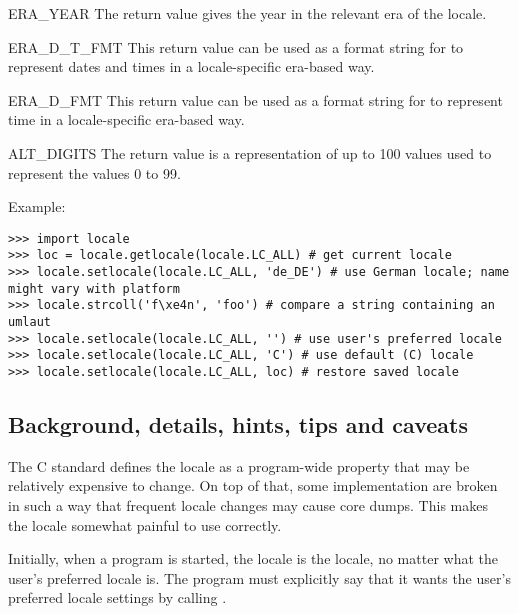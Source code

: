 \begin{datadesc}{ERA_YEAR}
The return value gives the year in the relevant era of the locale.
\end{datadesc}

\begin{datadesc}{ERA_D_T_FMT}
This return value can be used as a format string for
 to represent dates and times in a locale-specific
era-based way.
\end{datadesc}

\begin{datadesc}{ERA_D_FMT}
This return value can be used as a format string for
 to represent time in a locale-specific era-based
way.
\end{datadesc}

\begin{datadesc}{ALT_DIGITS}
The return value is a representation of up to 100 values used to
represent the values 0 to 99.
\end{datadesc}

Example:

\begin{verbatim}
>>> import locale
>>> loc = locale.getlocale(locale.LC_ALL) # get current locale
>>> locale.setlocale(locale.LC_ALL, 'de_DE') # use German locale; name might vary with platform
>>> locale.strcoll('f\xe4n', 'foo') # compare a string containing an umlaut 
>>> locale.setlocale(locale.LC_ALL, '') # use user's preferred locale
>>> locale.setlocale(locale.LC_ALL, 'C') # use default (C) locale
>>> locale.setlocale(locale.LC_ALL, loc) # restore saved locale
\end{verbatim}


\subsection{Background, details, hints, tips and caveats}

The C standard defines the locale as a program-wide property that may
be relatively expensive to change.  On top of that, some
implementation are broken in such a way that frequent locale changes
may cause core dumps.  This makes the locale somewhat painful to use
correctly.

Initially, when a program is started, the locale is the  locale, no
matter what the user's preferred locale is.  The program must
explicitly say that it wants the user's preferred locale settings by
calling .


